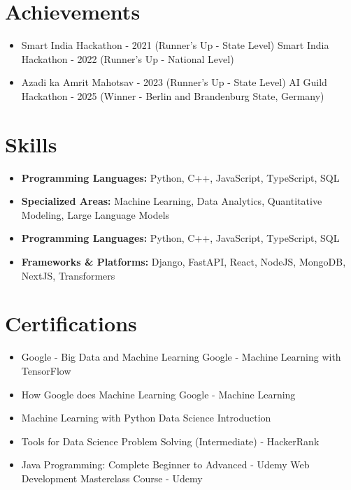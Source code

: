 \documentclass[a4paper,10pt]{article}
\begin{document}
\section*{Achievements}
\begin{itemize}
\item Smart India Hackathon - 2021 (Runner's Up - State Level) \hfill Smart India Hackathon - 2022 (Runner's Up - National Level)
\item Azadi ka Amrit Mahotsav - 2023 (Runner's Up - State Level) \hfill AI Guild Hackathon - 2025 (Winner - Berlin and Brandenburg State, Germany)
\end{itemize}

\section*{Skills}
\begin{itemize}
  \item \textbf{Programming Languages:} Python, C++, JavaScript, TypeScript, SQL
  \item \textbf{Specialized Areas:} Machine Learning, Data Analytics, Quantitative Modeling, Large Language Models
  \item \textbf{Programming Languages:} Python, C++, JavaScript, TypeScript, SQL
  \item \textbf{Frameworks \& Platforms:} Django, FastAPI, React, NodeJS, MongoDB, NextJS, Transformers
\end{itemize}

\section*{Certifications}
\begin{itemize}
\item Google - Big Data and Machine Learning \hfill Google - Machine Learning with TensorFlow
\item How Google does Machine Learning \hfill Google - Machine Learning
\item Machine Learning with Python \hfill Data Science Introduction
\item Tools for Data Science \hfill Problem Solving (Intermediate) - HackerRank
\item Java Programming: Complete Beginner to Advanced - Udemy \hfill Web Development Masterclass Course - Udemy
\end{itemize}
\end{document}
